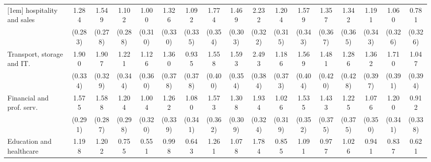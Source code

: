 {\begin{tabular}{l*{16}{c}}
[1em]
hospitality and sales&       1.284\sym{***}&       1.549\sym{***}&       1.102\sym{***}&       1.000\sym{**} &       1.326\sym{***}&       1.092\sym{**} &       1.774\sym{***}&       1.469\sym{***}&       2.232\sym{***}&       1.204\sym{***}&       1.579\sym{***}&       1.357\sym{***}&       1.342\sym{***}&       1.191\sym{***}&       1.060\sym{**} &       0.781\sym{*}  \\
                    &     (0.283)         &     (0.278)         &     (0.288)         &     (0.310)         &     (0.330)         &     (0.335)         &     (0.354)         &     (0.303)         &     (0.322)         &     (0.315)         &     (0.343)         &     (0.367)         &     (0.365)         &     (0.343)         &     (0.326)         &     (0.326)         \\
[1em]
Transport, storage and IT.&       1.900\sym{***}&       1.907\sym{***}&       1.221\sym{***}&       1.126\sym{**} &       1.360\sym{***}&       0.935\sym{*}  &       1.558\sym{***}&       1.593\sym{***}&       2.493\sym{***}&       1.186\sym{**} &       1.569\sym{***}&       1.481\sym{***}&       1.286\sym{**} &       1.362\sym{***}&       1.710\sym{***}&       1.047\sym{**} \\
                    &     (0.334)         &     (0.329)         &     (0.344)         &     (0.360)         &     (0.378)         &     (0.378)         &     (0.400)         &     (0.354)         &     (0.384)         &     (0.373)         &     (0.404)         &     (0.420)         &     (0.428)         &     (0.397)         &     (0.391)         &     (0.394)         \\
[1em]
Financial and prof. serv.&       1.575\sym{***}&       1.588\sym{***}&       1.204\sym{***}&       1.004\sym{**} &       1.262\sym{***}&       1.080\sym{**} &       1.573\sym{***}&       1.308\sym{***}&       1.934\sym{***}&       1.026\sym{**} &       1.535\sym{***}&       1.433\sym{***}&       1.225\sym{**} &       1.076\sym{**} &       1.200\sym{***}&       0.912\sym{**} \\
                    &     (0.291)         &     (0.287)         &     (0.298)         &     (0.320)         &     (0.339)         &     (0.341)         &     (0.362)         &     (0.309)         &     (0.324)         &     (0.319)         &     (0.352)         &     (0.375)         &     (0.375)         &     (0.350)         &     (0.341)         &     (0.338)         \\
[1em]
Education and healthcare&       1.198\sym{***}&       1.202\sym{***}&       0.755\sym{*}  &       0.551         &       0.998\sym{**} &       0.643         &       1.261\sym{***}&       1.078\sym{***}&       1.784\sym{***}&       0.855\sym{**} &       1.091\sym{**} &       0.977\sym{**} &       1.026\sym{**} &       0.941\sym{**} &       0.837\sym{*}  &       0.621         \\

\end{tabular}}
